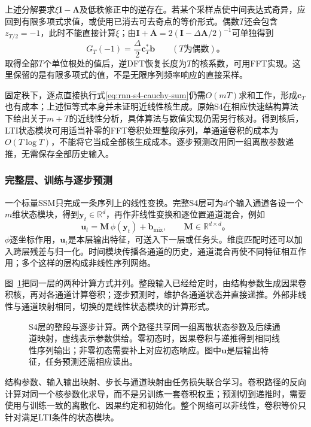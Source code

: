 上述分解要求$\xi\bm I-\bm\Lambda$及低秩修正中的逆存在。若某个采样点使中间表达式奇异，应回到有限多项式求值，或使用已消去可去奇点的等价形式。偶数$T$还会包含$z_{T/2}=-1$，此时不能直接计算$\xi$；由$\bm I+\overline{\bm A}=2(\bm I-\Delta\bm A/2)^{-1}$可单独得到
\[
  G_T(-1)=\frac{\Delta}{2}\bm c_T^*\bm b
  \qquad(T\text{为偶数})\text{。}
\]
取得全部$T$个单位根处的值后，逆DFT恢复长度为$T$的核系数，可用FFT实现。这里保留的是有限多项式的值，不是无限序列频率响应的直接采样。

固定秩下，逐点直接执行式\eqref{eq:rnn-s4-cauchy-sum}仍需$O(mT)$求和工作，形成$\bm c_T$也有成本；上述恒等式本身并未证明近线性核生成。原始S4在相应快速结构算法下给出关于$m+T$的近线性分析，具体算法与数值实现仍需另行核对。得到核后，LTI状态模块可用适当补零的FFT卷积处理整段序列，单通道卷积的成本为$O(T\log T)$，不能将它当成全部核生成成本。逐步预测改用同一组离散参数递推，无需保存全部历史输入。

\subsubsection{完整层、训练与逐步预测}
\label{sec:rnn-s4-architecture}

一个标量SSM只完成一条序列上的线性变换。完整S4层可为$d$个输入通道各设一个$m$维状态模块，得到$\bm y_t\in\mathbb R^d$，再作非线性变换和逐位置通道混合，例如
\begin{equation}
  \bm u_t=\bm M\,\phi(\bm y_t)+\bm b_{\mathrm{mix}},
  \qquad\bm M\in\mathbb R^{d\times d}\text{。}
  \label{eq:rnn-s4-channel-layer}
\end{equation}
$\phi$逐坐标作用，$\bm u_t$是本层输出特征，可送入下一层或任务头。维度匹配时还可以加入跨层残差与归一化。时间模块传播各通道的历史，通道混合再使不同特征相互作用；多个这样的层构成非线性序列网络。

图~\ref{fig:rnn-s4}把同一层的两种计算方式并列。整段输入已经给定时，由结构参数生成因果卷积核，再对各通道计算卷积；逐步预测时，维护各通道状态并直接递推。外部非线性与通道映射相同，切换的是线性状态模块的计算形式。
\begin{figure}[htb]
  \centering
  
  \caption{S4层的整段与逐步计算。两个路径共享同一组离散状态参数及后续通道映射，虚线表示参数供给。零初态时，因果卷积与递推得到相同线性序列输出；非零初态需要补上对应初态响应。图中$\bm u$是层输出特征，任务预测还需相应读出。}
  \label{fig:rnn-s4}
\end{figure}

结构参数、输入输出映射、步长与通道映射由任务损失联合学习。卷积路径的反向计算对同一个核参数化求导，而不是另训练一套卷积权重；预测切到递推时，需要使用与训练一致的离散化、因果约定和初始化。整个网络可以非线性，卷积等价只针对满足LTI条件的状态模块。

